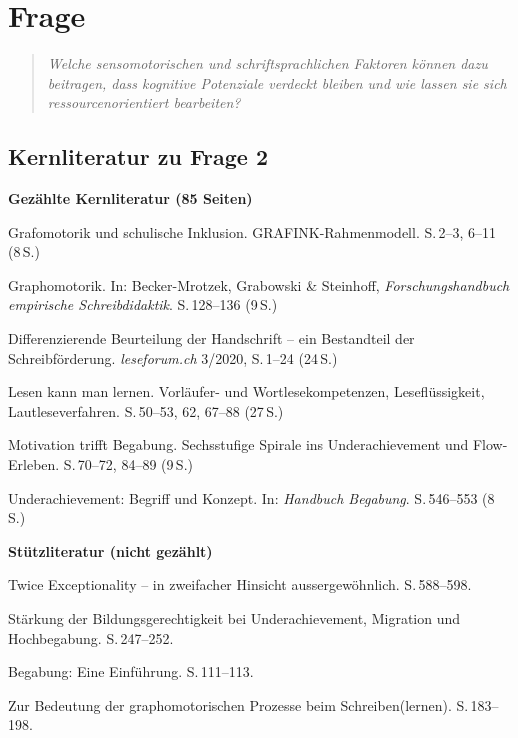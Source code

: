 \documentclass[ngerman, a4paper]{article}
\begin{document}
\section{Frage}
\label{sec:frage2}
 
\begin{quote}\itshape
Welche sensomotorischen und schriftsprachlichen
Faktoren können dazu beitragen, dass kognitive Potenziale verdeckt bleiben
und wie lassen sie sich 
ressourcenorientiert bearbeiten?
\end{quote}

\subsection{Kernliteratur zu Frage 2}
 
\textbf{Gezählte Kernliteratur (85 Seiten)}

\begin{litdesc}
  \item[\cite{saegesserwyss2021grafinkrahmenmodell}] Grafomotorik und
    schulische Inklusion. GRAFINK-Rahmenmodell.
    S.\,2--3, 6--11 (8\,S.)
  \item[\cite{nottbusch2017graphomotorik}] Graphomotorik.
    In: Becker-Mrotzek, Grabowski \& Steinhoff,
    \textit{Forschungshandbuch empirische Schreibdidaktik}.
    S.\,128--136 (9\,S.)
  \item[\cite{hurschler2020handschriftbeurteilung}] Differenzierende
    Beurteilung der Handschrift -- ein Bestandteil der Schreibförderung.
    \textit{leseforum.ch} 3/2020, S.\,1--24 (24\,S.)
  \item[\cite{gold2018lesenkannmanlernen}] Lesen kann man lernen.
    Vorläufer- und Wortlesekompetenzen, Leseflüssigkeit,
    Lautleseverfahren. S.\,50--53, 62, 67--88 (27\,S.)
  \item[\cite{lehwald2017motivation}] Motivation trifft Begabung.
    Sechsstufige Spirale ins Underachievement und Flow-Erleben.
    S.\,70--72, 84--89 (9\,S.)
  \item[\cite{greiten2021underachievement}] Underachievement: Begriff
    und Konzept. In: \textit{Handbuch Begabung}. S.\,546--553 (8\,S.)
\end{litdesc}

\textbf{Stützliteratur (nicht gezählt)}

\begin{litdesc}
  \item[\cite{baumschader2021twice}] Twice Exceptionality -- in
    zweifacher Hinsicht aussergewöhnlich. S.\,588--598.
  \item[\cite{warneckehauke2020bildungsgerechtigkeit}] Stärkung der
    Bildungsgerechtigkeit bei Underachievement, Migration und
    Hochbegabung. S.\,247--252.
  \item[\cite{hoyer2013begabung}] Begabung: Eine Einführung.
    S.\,111--113.
  \item[\cite{sturm2016graphomotorik}] Zur Bedeutung der graphomotorischen
    Prozesse beim Schreiben(lernen). S.\,183--198.
\end{litdesc}
 
\end{document}
